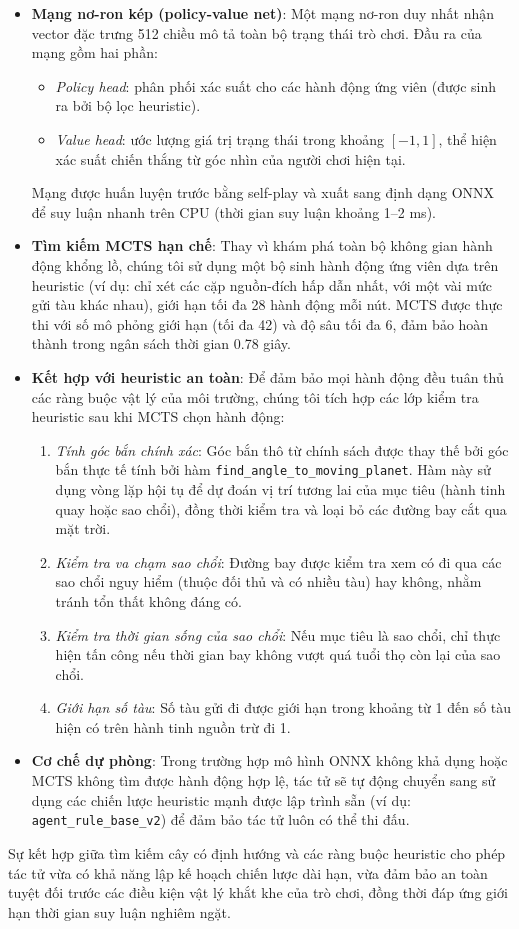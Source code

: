\begin{itemize}
    \item \textbf{Mạng nơ-ron kép (policy-value net)}: Một mạng nơ-ron duy nhất nhận vector đặc trưng 512 chiều mô tả toàn bộ trạng thái trò chơi. 
    Đầu ra của mạng gồm hai phần:
    \begin{itemize}
        \item \textit{Policy head}: phân phối xác suất cho các hành động ứng viên (được sinh ra bởi bộ lọc heuristic).
        \item \textit{Value head}: ước lượng giá trị trạng thái trong khoảng $[-1, 1]$, thể hiện xác suất chiến thắng từ góc nhìn của người chơi hiện tại.
    \end{itemize}
    Mạng được huấn luyện trước bằng self-play và xuất sang định dạng ONNX để suy luận nhanh trên CPU (thời gian suy luận khoảng 1--2 ms).
    
    \item \textbf{Tìm kiếm MCTS hạn chế}: Thay vì khám phá toàn bộ không gian hành động khổng lồ, chúng tôi sử dụng một bộ sinh hành động ứng viên dựa trên heuristic (ví dụ: chỉ xét các cặp nguồn-đích hấp dẫn nhất, với một vài mức gửi tàu khác nhau), giới hạn tối đa 28 hành động mỗi nút. 
    MCTS được thực thi với số mô phỏng giới hạn (tối đa 42) và độ sâu tối đa 6, đảm bảo hoàn thành trong ngân sách thời gian 0.78 giây.
    
    \item \textbf{Kết hợp với heuristic an toàn}: Để đảm bảo mọi hành động đều tuân thủ các ràng buộc vật lý của môi trường, chúng tôi tích hợp các lớp kiểm tra heuristic sau khi MCTS chọn hành động:
    \begin{enumerate}
        \item \textit{Tính góc bắn chính xác}: Góc bắn thô từ chính sách được thay thế bởi góc bắn thực tế tính bởi hàm \texttt{find\_angle\_to\_moving\_planet}. Hàm này sử dụng vòng lặp hội tụ để dự đoán vị trí tương lai của mục tiêu (hành tinh quay hoặc sao chổi), đồng thời kiểm tra và loại bỏ các đường bay cắt qua mặt trời.
        \item \textit{Kiểm tra va chạm sao chổi}: Đường bay được kiểm tra xem có đi qua các sao chổi nguy hiểm (thuộc đối thủ và có nhiều tàu) hay không, nhằm tránh tổn thất không đáng có.
        \item \textit{Kiểm tra thời gian sống của sao chổi}: Nếu mục tiêu là sao chổi, chỉ thực hiện tấn công nếu thời gian bay không vượt quá tuổi thọ còn lại của sao chổi.
        \item \textit{Giới hạn số tàu}: Số tàu gửi đi được giới hạn trong khoảng từ 1 đến số tàu hiện có trên hành tinh nguồn trừ đi 1.
    \end{enumerate}
    
    \item \textbf{Cơ chế dự phòng}: Trong trường hợp mô hình ONNX không khả dụng hoặc MCTS không tìm được hành động hợp lệ, tác tử sẽ tự động chuyển sang sử dụng các chiến lược heuristic mạnh được lập trình sẵn (ví dụ: \texttt{agent\_rule\_base\_v2}) để đảm bảo tác tử luôn có thể thi đấu.
\end{itemize}

Sự kết hợp giữa tìm kiếm cây có định hướng và các ràng buộc heuristic cho phép tác tử vừa có khả năng lập kế hoạch chiến lược dài hạn, vừa đảm bảo an toàn tuyệt đối trước các điều kiện vật lý khắt khe của trò chơi, đồng thời đáp ứng giới hạn thời gian suy luận nghiêm ngặt.